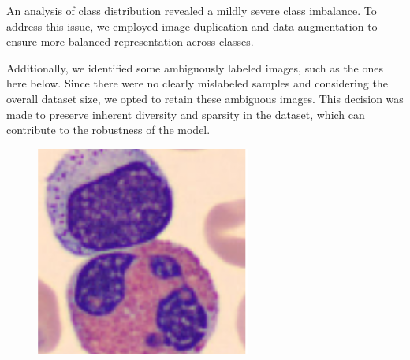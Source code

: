 \documentclass[11pt]{article}
\begin{document}
An analysis of class distribution revealed a mildly severe class imbalance. To address this issue, we employed image duplication and data augmentation to ensure more balanced representation across classes.

Additionally, we identified some ambiguously labeled images, such as the ones here below. Since there were no clearly mislabeled samples and considering the overall dataset size, we opted to retain these ambiguous images. This decision was made to preserve inherent diversity and sparsity in the dataset, which can contribute to the robustness of the model.

\begin{figure}[H]
    \centering
    \begin{minipage}{0.2\textwidth}
        \centering
        \includegraphics[width=\linewidth]{images/ambiguous1.png}
    \end{minipage}
    \hspace{2cm}
    \begin{minipage}{0.2\textwidth}
        \centering

\end{minipage}
\end{figure}
\end{document}
